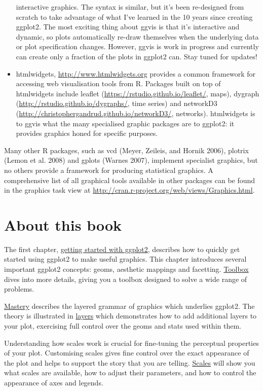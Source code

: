 \begin{itemize}
  interactive graphics. The syntax is similar, but it's been re-designed
  from scratch to take advantage of what I've learned in the 10 years
  since creating ggplot2. The most exciting thing about ggvis is that
  it's interactive and dynamic, so plots automatically re-draw
  themselves when the underlying data or plot specification changes.
  However, ggvis is work in progress and currently can create only a
  fraction of the plots in ggplot2 can. Stay tuned for updates!
\item
  htmlwidgets, \url{http://www.htmlwidgets.org} provides a common
  framework for accessing web visualisation tools from R. Packages built
  on top of htmlwidgets include leaflet
  (\url{https://rstudio.github.io/leaflet/}, maps), dygraph
  (\url{http://rstudio.github.io/dygraphs/}, time series) and networkD3
  (\url{http://christophergandrud.github.io/networkD3/}, networks).
  htmlwidgets is to ggvis what the many specialised graphic packages are
  to ggplot2: it provides graphics honed for specific purposes.
\end{itemize}

Many other R packages, such as vcd (Meyer, Zeileis, and Hornik 2006),
plotrix (Lemon et al. 2008) and gplots (Warnes 2007), implement
specialist graphics, but no others provide a framework for producing
statistical graphics. A comprehensive list of all graphical tools
available in other packages can be found in the graphics task view at
\url{http://cran.r-project.org/web/views/Graphics.html}.

\section{About this book}

The first chapter, \hyperref[cha:getting-started]{getting started with
ggplot2}, describes how to quickly get started using ggplot2 to make
useful graphics. This chapter introduces several important ggplot2
concepts: geoms, aesthetic mappings and facetting.
\hyperref[cha:toolbox]{Toolbox} dives into more details, giving you a
toolbox designed to solve a wide range of problems.

\hyperref[cha:mastery]{Mastery} describes the layered grammar of
graphics which underlies ggplot2. The theory is illustrated in
\hyperref[cha:layers]{layers} which demonstrates how to add additional
layers to your plot, exercising full control over the geoms and stats
used within them.

Understanding how scales work is crucial for fine-tuning the perceptual
properties of your plot. Customising scales gives fine control over the
exact appearance of the plot and helps to support the story that you are
telling. \hyperref[cha:scales]{Scales} will show you what scales are
available, how to adjust their parameters, and how to control the
appearance of axes and legends.


